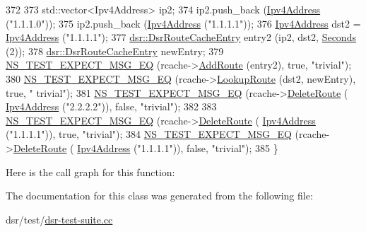 \begin{DoxyCode}
372 
373   std::vector<Ipv4Address> ip2;
374   ip2.push\_back (\hyperlink{classns3_1_1Ipv4Address}{Ipv4Address} (\textcolor{stringliteral}{"1.1.1.0"}));
375   ip2.push\_back (\hyperlink{classns3_1_1Ipv4Address}{Ipv4Address} (\textcolor{stringliteral}{"1.1.1.1"}));
376   \hyperlink{classns3_1_1Ipv4Address}{Ipv4Address} dst2 = \hyperlink{classns3_1_1Ipv4Address}{Ipv4Address} (\textcolor{stringliteral}{"1.1.1.1"});
377   \hyperlink{classns3_1_1dsr_1_1DsrRouteCacheEntry}{dsr::DsrRouteCacheEntry} entry2 (ip2, dst2, \hyperlink{group__timecivil_ga33c34b816f8ff6628e33d5c8e9713b9e}{Seconds} (2));
378   \hyperlink{classns3_1_1dsr_1_1DsrRouteCacheEntry}{dsr::DsrRouteCacheEntry} newEntry;
379   \hyperlink{group__testing_ga7304ba46a28d8cf08dfdfd6499cf7068}{NS\_TEST\_EXPECT\_MSG\_EQ} (rcache->\hyperlink{classns3_1_1dsr_1_1DsrRouteCache_aff3dfb9a3d25a73e79363e8d6d977003}{AddRoute} (entry2), \textcolor{keyword}{true}, \textcolor{stringliteral}{"trivial"});
380   \hyperlink{group__testing_ga7304ba46a28d8cf08dfdfd6499cf7068}{NS\_TEST\_EXPECT\_MSG\_EQ} (rcache->\hyperlink{classns3_1_1dsr_1_1DsrRouteCache_a563d72057fbabedafb85907ea79d692f}{LookupRoute} (dst2, newEntry), \textcolor{keyword}{true}, \textcolor{stringliteral}{"
      trivial"});
381   \hyperlink{group__testing_ga7304ba46a28d8cf08dfdfd6499cf7068}{NS\_TEST\_EXPECT\_MSG\_EQ} (rcache->\hyperlink{classns3_1_1dsr_1_1DsrRouteCache_aa3ad8c714828a57eeaae558320ee6523}{DeleteRoute} (
      \hyperlink{classns3_1_1Ipv4Address}{Ipv4Address} (\textcolor{stringliteral}{"2.2.2.2"})), \textcolor{keyword}{false}, \textcolor{stringliteral}{"trivial"});
382 
383   \hyperlink{group__testing_ga7304ba46a28d8cf08dfdfd6499cf7068}{NS\_TEST\_EXPECT\_MSG\_EQ} (rcache->\hyperlink{classns3_1_1dsr_1_1DsrRouteCache_aa3ad8c714828a57eeaae558320ee6523}{DeleteRoute} (
      \hyperlink{classns3_1_1Ipv4Address}{Ipv4Address} (\textcolor{stringliteral}{"1.1.1.1"})), \textcolor{keyword}{true}, \textcolor{stringliteral}{"trivial"});
384   \hyperlink{group__testing_ga7304ba46a28d8cf08dfdfd6499cf7068}{NS\_TEST\_EXPECT\_MSG\_EQ} (rcache->\hyperlink{classns3_1_1dsr_1_1DsrRouteCache_aa3ad8c714828a57eeaae558320ee6523}{DeleteRoute} (
      \hyperlink{classns3_1_1Ipv4Address}{Ipv4Address} (\textcolor{stringliteral}{"1.1.1.1"})), \textcolor{keyword}{false}, \textcolor{stringliteral}{"trivial"});
385 \}
\end{DoxyCode}


Here is the call graph for this function\+:




The documentation for this class was generated from the following file\+:\begin{DoxyCompactItemize}
\item 
dsr/test/\hyperlink{dsr-test-suite_8cc}{dsr-\/test-\/suite.\+cc}\end{DoxyCompactItemize}
